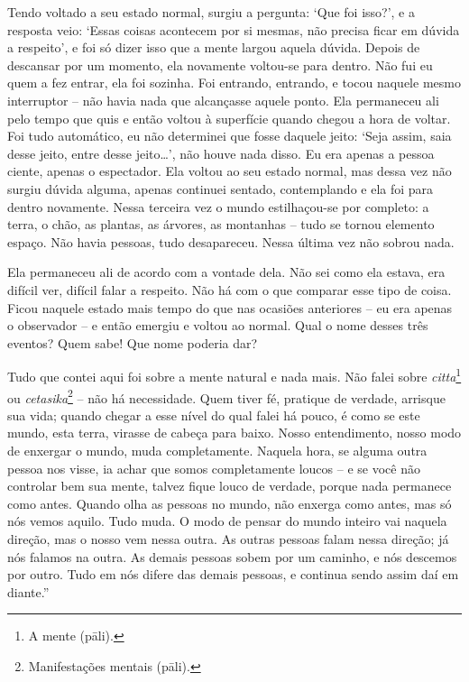 Tendo voltado a seu estado normal, surgiu a pergunta: `Que foi isso?', e
a resposta veio: `Essas coisas acontecem por si mesmas, não precisa
ficar em dúvida a respeito', e foi só dizer isso que a mente largou
aquela dúvida. Depois de descansar por um momento, ela novamente
voltou-se para dentro. Não fui eu quem a fez entrar, ela foi sozinha.
Foi entrando, entrando, e tocou naquele mesmo interruptor -- não havia
nada que alcançasse aquele ponto. Ela permaneceu ali pelo tempo que quis
e então voltou à superfície quando chegou a hora de voltar. Foi tudo
automático, eu não determinei que fosse daquele jeito: `Seja assim, saia
desse jeito, entre desse jeito\ldots{}', não houve nada disso. Eu era
apenas a pessoa ciente, apenas o espectador. Ela voltou ao seu estado
normal, mas dessa vez não surgiu dúvida alguma, apenas continuei
sentado, contemplando e ela foi para dentro novamente. Nessa terceira
vez o mundo estilhaçou-se por completo: a terra, o chão, as plantas, as
árvores, as montanhas -- tudo se tornou elemento espaço. Não havia
pessoas, tudo desapareceu. Nessa última vez não sobrou nada.

Ela permaneceu ali de acordo com a vontade dela. Não sei como ela
estava, era difícil ver, difícil falar a respeito. Não há com o que
comparar esse tipo de coisa. Ficou naquele estado mais tempo do que nas
ocasiões anteriores -- eu era apenas o observador -- e então emergiu e
voltou ao normal. Qual o nome desses três eventos? Quem sabe! Que nome
poderia dar?

Tudo que contei aqui foi sobre a mente natural e nada mais. Não falei
sobre \emph{citta}\footnote{A mente (pāli).} ou
\emph{cetasika}\footnote{Manifestações mentais (pāli).} -- não há
necessidade. Quem tiver fé, pratique de verdade, arrisque sua vida;
quando chegar a esse nível do qual falei há pouco, é como se este mundo,
esta terra, virasse de cabeça para baixo. Nosso entendimento, nosso modo
de enxergar o mundo, muda completamente. Naquela hora, se alguma outra
pessoa nos visse, ia achar que somos completamente loucos -- e se você
não controlar bem sua mente, talvez fique louco de verdade, porque nada
permanece como antes. Quando olha as pessoas no mundo, não enxerga como
antes, mas só nós vemos aquilo. Tudo muda. O modo de pensar do mundo
inteiro vai naquela direção, mas o nosso vem nessa outra. As outras
pessoas falam nessa direção; já nós falamos na outra. As demais pessoas
sobem por um caminho, e nós descemos por outro. Tudo em nós difere das
demais pessoas, e continua sendo assim daí em diante.''

